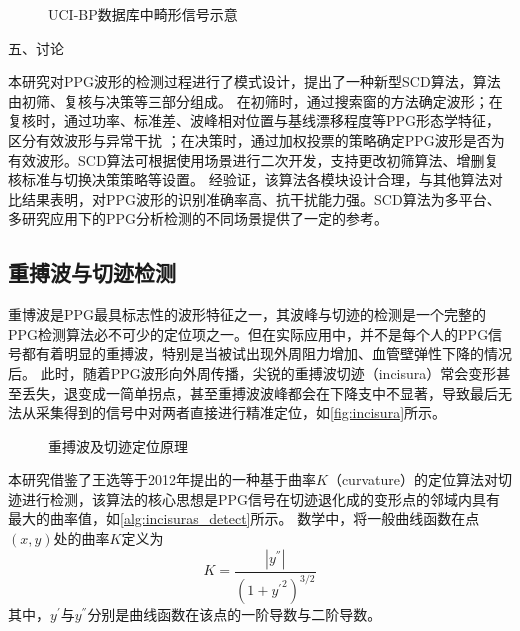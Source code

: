 \begin{figure}[h]
    \centering
    \quad
    \quad
    \caption{\label{fig:ucibp_abnormal}UCI-BP数据库中畸形信号示意}
\end{figure}

五、讨论

本研究对PPG波形的检测过程进行了模式设计，提出了一种新型SCD算法，算法由初筛、复核与决策等三部分组成。
在初筛时，通过搜索窗的方法确定波形；在复核时，通过功率、标准差、波峰相对位置与基线漂移程度等PPG形态学特征，区分有效波形与异常干扰
；在决策时，通过加权投票的策略确定PPG波形是否为有效波形。SCD算法可根据使用场景进行二次开发，支持更改初筛算法、增删复核标准与切换决策策略等设置。
经验证，该算法各模块设计合理，与其他算法对比结果表明，对PPG波形的识别准确率高、抗干扰能力强。SCD算法为多平台、多研究应用下的PPG分析检测的不同场景提供了一定的参考。

\subsection{重搏波与切迹检测}
重博波是PPG最具标志性的波形特征之一，其波峰与切迹的检测是一个完整的PPG检测算法必不可少的定位项之一\cite{Wang2012}。但在实际应用中，并不是每个人的PPG信号都有着明显的重搏波，特别是当被试出现外周阻力增加、血管壁弹性下降的情况后\cite{mmt}。
此时，随着PPG波形向外周传播，尖锐的重搏波切迹（incisura）常会变形甚至丢失，退变成一简单拐点，甚至重搏波波峰都会在下降支中不显著，导致最后无法从采集得到的信号中对两者直接进行精准定位，如\autoref{fig:incisura}所示。

\begin{figure}[htbp]
    \centering
    \quad
    \caption[重搏波及切迹定位原理]{\label{fig:incisura}重搏波及切迹定位原理\cite{Wang2012,Su2014}}
\end{figure}

本研究借鉴了王选等\cite{Wang2012}于2012年提出的一种基于曲率$K$（curvature）的定位算法对切迹进行检测，该算法的核心思想是PPG信号在切迹退化成的变形点的邻域内具有最大的曲率值，如\autoref{alg:incisuras_detect}所示。
数学中，将一般曲线函数在点$(x,y)$处的曲率$K$定义为
\begin{equation}
    \label{equ:curvature}
    K=\frac{|y^{''}|}{{(1+{y^{'}}^2)}^{3/2}}
\end{equation}
其中，$y^{'}$与$y^{''}$分别是曲线函数在该点的一阶导数与二阶导数。

